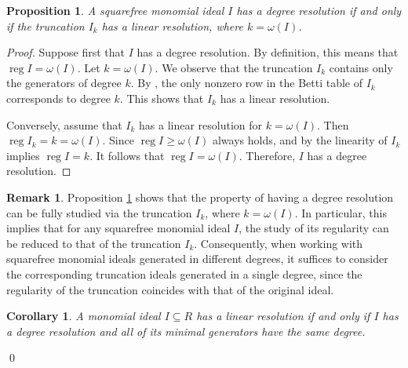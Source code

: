 \documentclass[a4paper,12pt]{amsart}
\numberwithin{equation}{section}
\newtheorem{proposition}[theorem]{Proposition}
\newtheorem{corollary}[theorem]{Corollary}
\theoremstyle{definition}
\newtheorem{remark}[theorem]{Remark}
\DeclareMathOperator{\reg}{reg}
\begin{document}
\begin{proposition}\label{degree resolution and I_k}
	A squarefree monomial ideal $I$ has a degree resolution if and only if the truncation $I_k$ has a linear resolution, where $k=\omega(I)$.
\end{proposition}
\begin{proof}
	Suppose first that $I$ has a degree resolution. By definition, this means that $\reg I=\omega(I)$. Let $k=\omega(I)$. We observe that the truncation $I_k$ contains only the generators of degree $k$. By \cite[Theorem 2.5]{AhmedFrobergNamiq2023}, the only nonzero row in the Betti table of $I_k$ corresponds to degree $k$. This shows that $I_k$ has a linear resolution.
	
	Conversely, assume that $I_{k}$ has a linear resolution for $k=\omega(I)$. Then $\reg I_k=k=\omega(I)$. Since $\reg I\ge\omega(I)$ always holds, and by \cite[Theorem 2.5]{AhmedFrobergNamiq2023} the linearity of $I_k$ implies $\reg I=k$. It follows that $\reg I=\omega(I)$. Therefore, $I$ has a degree resolution.
\end{proof}

\begin{remark}
	Proposition \ref{degree resolution and I_k} shows that the property of having a degree resolution can be fully studied via the truncation $I_k$, where $k=\omega(I)$. In particular, this implies that for any squarefree monomial ideal $I$, the study of its regularity can be reduced to that of the truncation $I_k$. Consequently, when working with squarefree monomial ideals generated in different degrees, it suffices to consider the corresponding truncation ideals generated in a single degree, since the regularity of the truncation coincides with that of the original ideal.
\end{remark}

\begin{corollary}
	A monomial ideal $I\subseteq R$ has a linear resolution if and only if $I$ has a degree resolution and all of its minimal generators have the same degree.
\end{corollary}
\qed
\end{document}
